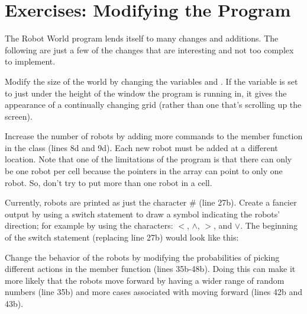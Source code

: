 \vspace{+0.25cm}
{\color{\mycolor}\noindent\hrulefill}
\section{Exercises: Modifying the Program}

The Robot World program lends itself to many changes and additions.  The following are just a few of the changes that are interesting and not too complex to implement.  

Modify the size of the world by changing the variables  and .  If the  variable is set to just under the height of the window the program is running in, it gives the appearance of a continually changing grid (rather than one that's scrolling up the screen).

Increase the number of robots by adding more  commands to the  member function in the  class (lines 8d and 9d).  Each new robot must be added at a different location.  Note that one of the limitations of the program is that there can only be one robot per cell because the pointers in the  array can point to only one robot.  So, don't try to put more than one robot in a cell.

Currently, robots are printed as just the character \# (line 27b).  Create a fancier output by using a switch statement to draw a symbol indicating the robots' direction; for example by using the characters: $<$, $\wedge$, $>$, and  $\vee$.  The beginning of the switch statement (replacing line 27b) would look like this:\\

Change the behavior of the robots by modifying the probabilities of picking different actions in the  member function (lines 35b-48b).  Doing this can make it more likely that the robots move forward by having a wider range of random numbers (line 35b) and more cases associated with moving forward (lines 42b and 43b).

